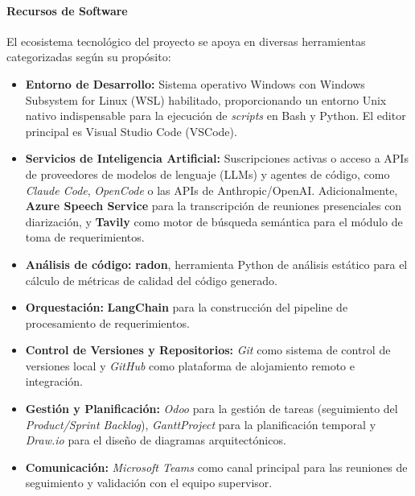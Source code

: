 \documentclass[11pt, letterpaper]{article}
\begin{document}
\paragraph{Recursos de Software}
\label{sec:recursos_software}
El ecosistema tecnológico del proyecto se apoya en diversas herramientas categorizadas según su propósito:
\begin{itemize}
    \item \textbf{Entorno de Desarrollo:} Sistema operativo Windows con Windows Subsystem for Linux (WSL) habilitado, proporcionando un entorno Unix nativo indispensable para la ejecución de \textit{scripts} en Bash y Python. El editor principal es Visual Studio Code (VSCode).
    \item \textbf{Servicios de Inteligencia Artificial:} Suscripciones activas o acceso a APIs de proveedores de modelos de lenguaje (LLMs) y agentes de código, como \textit{Claude Code}, \textit{OpenCode} o las APIs de Anthropic/OpenAI. Adicionalmente, \textbf{Azure Speech Service} para la transcripción de reuniones presenciales con diarización, y \textbf{Tavily} como motor de búsqueda semántica para el módulo de toma de requerimientos.
    \item \textbf{Análisis de código:} \textbf{radon}, herramienta Python de análisis estático para el cálculo de métricas de calidad del código generado.
    \item \textbf{Orquestación:} \textbf{LangChain} para la construcción del pipeline de procesamiento de requerimientos.
    \item \textbf{Control de Versiones y Repositorios:} \textit{Git} como sistema de control de versiones local y \textit{GitHub} como plataforma de alojamiento remoto e integración.
    \item \textbf{Gestión y Planificación:} \textit{Odoo} para la gestión de tareas (seguimiento del \textit{Product/Sprint Backlog}), \textit{GanttProject} para la planificación temporal y \textit{Draw.io} para el diseño de diagramas arquitectónicos.
    \item \textbf{Comunicación:} \textit{Microsoft Teams} como canal principal para las reuniones de seguimiento y validación con el equipo supervisor.
\end{itemize}
\end{document}
